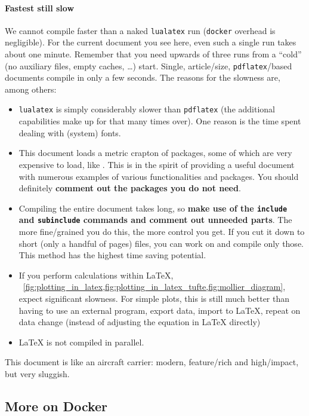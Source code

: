 \paragraph{Fastest still slow}
We cannot compile faster than a naked \texttt{lualatex} run (\texttt{docker} overhead is negligible).
For the current document you see here, even such a single run takes about one minute.
Remember that you need upwards of three runs from a \enquote{cold} (no auxiliary files, empty caches, \dots{}) start.
Single, article\-/size, \texttt{pdflatex}\-/based documents compile in only a few seconds.
The reasons for the slowness are, among others:
\begin{itemize}
    \item \texttt{lualatex} is simply considerably slower than \texttt{pdflatex}
        (the additional capabilities make up for that many times over).
        One reason is the time spent dealing with (system) fonts.
    \item This document loads a metric crapton of packages, some of which are very expensive to load, like .
        This is in the spirit of providing a useful document with numerous examples of various functionalities and packages.
        You should definitely \textbf{\textcolor{mRed}{comment out the packages you do not need}}.
    \item Compiling the entire document takes long, so \textbf{\textcolor{mRed}{make use of the \texttt{include} and \texttt{subinclude}} commands and comment out unneeded parts}.
        The more fine\-/grained you do this, the more control you get.
        If you cut it down to short (only a handful of  pages) files, you can work on and compile only those.
        This method has the highest time saving potential.
    \item If you perform  calculations within \LaTeX{}, \ \cref{fig:plotting_in_latex,fig:plotting_in_latex_tufte,fig:mollier_diagram}, expect significant slowness.
        For simple plots, this is still much better than having to use an external program, export data, import to \LaTeX{}, repeat on data change (instead of adjusting the equation in \LaTeX{} directly) 
    \item \LaTeX{} is not compiled in parallel.
\end{itemize}
This document is like an aircraft carrier: modern, feature\-/rich and high\-/impact, but very sluggish.

\subsection{More on Docker}


